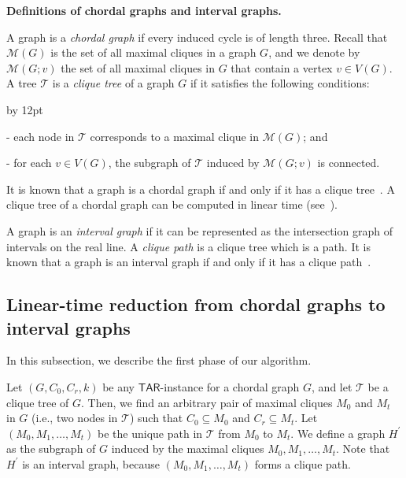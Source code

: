 \documentclass{llncs}
\newcommand{\ini}{0}
\newcommand{\tar}{r}
\newcommand{\cliq}{C}
\newcommand{\TARrule}{\mathsf{TAR}}
\newcommand{\Mset}[1]{\mathcal{M}(#1)}
\newcommand{\Msetv}[2]{\mathcal{M}(#1; #2)}
\newcommand{\subHp}{H^\prime}
\newenvironment{listing}[1]{\begin{list}{*}{\settowidth{\labelwidth}{#1}\setlength{\leftmargin}{\labelwidth}\advance \leftmargin by 12pt
\setlength{\itemsep}{0pt}\setlength{\parsep}{0pt}\setlength{\topsep}{0pt}\setlength{\parskip}{0pt}}}{\end{list}}
\newcounter{two}
\newcounter{three}
\begin{document}
\medskip

\noindent
	{\bf Definitions of chordal graphs and interval graphs.}

	A graph is a \emph{chordal graph} if every induced cycle is of length three.
	Recall that $\Mset{G}$ is the set of all maximal cliques in a graph $G$, and we denote by $\Msetv{G}{v}$ the set of all maximal cliques in $G$ that contain a vertex $v \in V(G)$. 
A tree $\mathcal{T}$ is a  \emph{clique tree} of a graph $G$ if it satisfies the following conditions:
	\begin{listing}{aa}
	\item[-] each node in $\mathcal{T}$ corresponds to a maximal clique in $\mathcal{M}(G)$; and 
	\item[-] for each $v \in V(G)$, the subgraph of $\mathcal{T}$ induced by $\Msetv{G}{v}$ is connected.
	\end{listing}
	It is known that a graph is a chordal graph if and only if it has a clique tree~\cite{Gavril74}.
	A clique tree of a chordal graph can be computed in linear time (see~\cite[\S 15.1]{Spinrad03}).

	A graph is an \emph{interval graph} if it can be represented as the intersection graph of intervals on the real line.
	A \emph{clique path} is a clique tree which is a path.
	It is known that a graph is an interval graph if and only if it has a clique path~\cite{FulkersonG65,GilmoreH64}.







\subsection{Linear-time reduction from chordal graphs to interval graphs}

	In this subsection, we describe the first phase of our algorithm. 

	Let $(G, \cliq_{\ini}, \cliq_{\tar}, k)$ be any $\TARrule$-instance for a chordal graph $G$, and let $\mathcal{T}$ be a clique tree of $G$.
	Then, we find an arbitrary pair of maximal cliques $M_{\ini}$ and $M_{t}$ in $G$ (i.e., two nodes in $\mathcal{T}$) such that $\cliq_{\ini} \subseteq M_{\ini}$ and $\cliq_{\tar} \subseteq M_{t}$.
	Let $(M_{\ini}, M_1, \ldots, M_t)$ be the unique path in $\mathcal{T}$ from $M_{\ini}$ to $M_t$. 
	We define a graph $\subHp$ as the subgraph of $G$ induced by the maximal cliques $M_{\ini}, M_1, \ldots, M_t$.
	Note that $\subHp$ is an interval graph, because $(M_{\ini}, M_1, \ldots, M_t)$ forms a clique path. 
\end{document}
